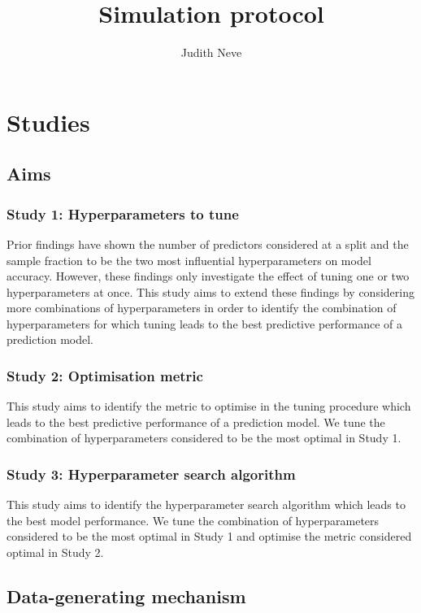 \documentclass{article}
\title{Simulation protocol}
\author{Judith Neve}
\begin{document}
\maketitle

\section{Studies}

\subsection{Aims}

\subsubsection{Study 1: Hyperparameters to tune}

Prior findings \cite{probst_tunability_2019} have shown the number of predictors considered at a split and the sample fraction to be the two most influential hyperparameters on model accuracy. However, these findings only investigate the effect of tuning one or two hyperparameters at once. This study aims to extend these findings by considering more combinations of hyperparameters in order to identify the combination of hyperparameters for which tuning leads to the best predictive performance of a prediction model.

\subsubsection{Study 2: Optimisation metric}

This study aims to identify the metric to optimise in the tuning procedure which leads to the best predictive performance of a prediction model. We tune the combination of hyperparameters considered to be the most optimal in Study 1.

\subsubsection{Study 3: Hyperparameter search algorithm}

This study aims to identify the hyperparameter search algorithm which leads to the best model performance. We tune the combination of hyperparameters considered to be the most optimal in Study 1 and optimise the metric considered optimal in Study 2.

\subsection{Data-generating mechanism}
\end{document}

